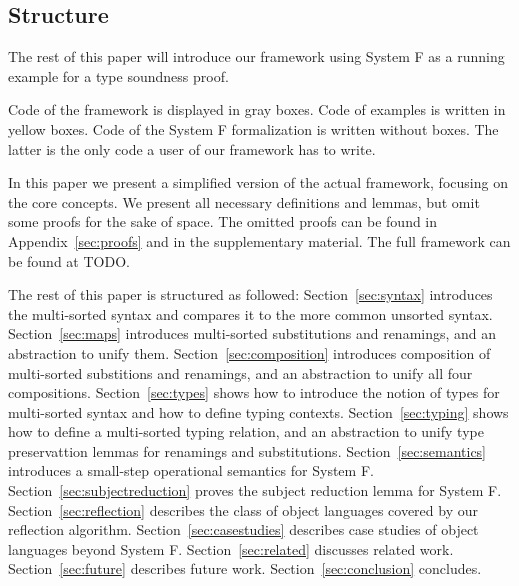 \documentclass[sigplan,10pt, anonymous]{acmart}
\begin{document}
  \subsection{Structure}
  \label{sec:introduction:structure}

  The rest of this paper will introduce our framework using System F
  as a running example for a type soundness proof.

  Code of the framework is displayed in gray boxes.
  Code of examples is written in yellow boxes.
  Code of the System F formalization is written without boxes. The
  latter is the only code a user of our framework has to write.

  In this paper we present a simplified version of the actual
  framework, focusing on the core concepts. We present all necessary
  definitions and lemmas, but omit some proofs for the sake of
  space. The omitted proofs can be found in Appendix~\ref{sec:proofs}
  and in the supplementary material. The full framework can be found at
  TODO.

  The rest of this paper is structured as followed:
  Section~\ref{sec:syntax} introduces the multi-sorted syntax and compares it to the
  more common unsorted syntax.
  Section~\ref{sec:maps} introduces multi-sorted substitutions and renamings, and
  an abstraction to unify them.
  Section~\ref{sec:composition} introduces composition of multi-sorted
  substitions and renamings, and an abstraction to unify all four
  compositions.
  Section~\ref{sec:types} shows how to introduce the notion of types
  for multi-sorted syntax and how to define typing contexts.
  Section~\ref{sec:typing} shows how to define a multi-sorted typing relation,
  and an abstraction to unify type preservattion lemmas for renamings and substitutions.
  Section~\ref{sec:semantics} introduces a small-step operational semantics for System F.
  Section~\ref{sec:subjectreduction} proves the subject reduction lemma for System F.
  Section~\ref{sec:reflection} describes the class of object languages covered by
  our reflection algorithm.
  Section~\ref{sec:casestudies} describes case studies of object languages beyond System F.
  Section~\ref{sec:related} discusses related work.
  Section~\ref{sec:future} describes future work.
  Section~\ref{sec:conclusion} concludes.
\end{document}
